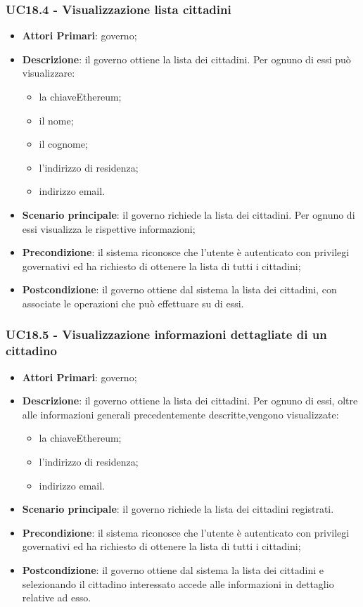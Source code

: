 \subsubsection{UC18.4 - Visualizzazione lista cittadini}
\begin{itemize}
	\item \textbf{Attori Primari}: governo;
	\item \textbf{Descrizione}: il governo ottiene la lista dei cittadini. Per ognuno di essi può visualizzare:
	\begin{itemize}
		\item la chiave\glosp Ethereum\glo;
		\item il nome;
		\item il cognome;
		\item l'indirizzo di residenza;
		\item indirizzo email.
	\end{itemize}
	\item \textbf{Scenario principale}: il governo richiede la lista dei cittadini. Per ognuno di essi visualizza le rispettive informazioni;
	\item \textbf{Precondizione}: il sistema riconosce che l'utente è autenticato con privilegi governativi ed ha richiesto di ottenere la lista di tutti i cittadini;
	\item \textbf{Postcondizione}: il governo ottiene dal sistema la lista dei cittadini, con associate le operazioni che può effettuare su di essi.
\end{itemize}


\subsubsection{UC18.5 - Visualizzazione informazioni dettagliate di un cittadino}
\begin{itemize}
	\item \textbf{Attori Primari}: governo;
	\item \textbf{Descrizione}: il governo ottiene la lista dei cittadini. Per ognuno di essi, oltre alle informazioni generali precedentemente descritte,vengono visualizzate:
	\begin{itemize}
		\item la chiave\glosp Ethereum\glo;
		\item l'indirizzo di residenza;
		\item indirizzo email.
	\end{itemize}
	\item \textbf{Scenario principale}: il governo richiede la lista dei cittadini registrati.
	\item \textbf{Precondizione}: il sistema riconosce che l'utente è autenticato con privilegi governativi ed ha richiesto di ottenere la lista di tutti i cittadini;
	\item \textbf{Postcondizione}: il governo ottiene dal sistema la lista dei cittadini e selezionando il cittadino interessato accede alle informazioni in dettaglio relative ad esso.
\end{itemize}

